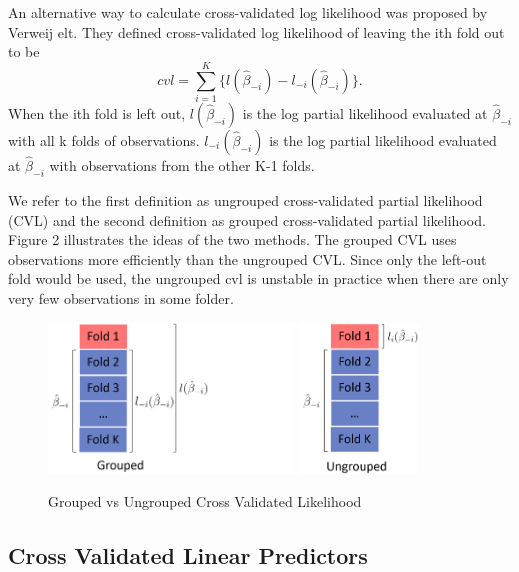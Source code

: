 \documentclass{article}\usepackage[]{graphicx}\usepackage[]{color}
\begin{document}
\par An alternative way to calculate cross-validated log likelihood was proposed by Verweij elt. They defined cross-validated log likelihood of leaving the ith fold out to be \begin{equation}cvl = \sum_{i=1}^{K} \{l(\hat{\beta}_{-i}) - l_{-i}(\hat{\beta}_{-i})\}. \end{equation} When the ith fold is left out, $l(\hat{\beta}_{-i})$ is the log partial likelihood evaluated at $\hat{\beta}_{-i}$ with all k folds of observations. $l_{-i}(\hat{\beta}_{-i})$ is the log partial likelihood evaluated at $\hat{\beta}_{-i}$ with observations from the other K-1 folds. 
  
\par We refer to the first definition as ungrouped cross-validated partial likelihood (CVL) and the second definition as grouped cross-validated partial likelihood. Figure 2 illustrates the ideas of the two methods. The grouped CVL uses observations more efficiently than the ungrouped CVL. Since only the left-out fold would be used, the ungrouped cvl is unstable in practice when there are only very few observations in some folder.  


\begin{figure}
    \centering
		\includegraphics[height= 4cm ]{./figures/02_1.png}
		\includegraphics[height= 4cm ]{./figures/02_2.png}
    \caption{Grouped vs Ungrouped Cross Validated Likelihood}
\end{figure}	

  \subsection{Cross Validated Linear Predictors}
\end{document}
